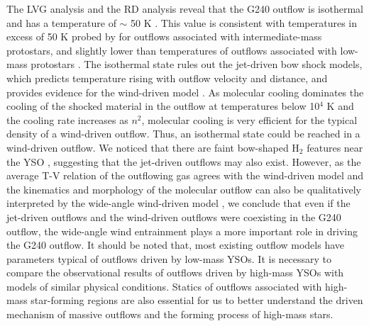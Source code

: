 The LVG analysis and the RD analysis reveal that the G240 outflow is isothermal and has a temperature of $\sim$ 50 K . This value is consistent with temperatures in excess of 50 K probed by \citet{2016A&A...587A..17V} for outflows associated with intermediate-mass protostars, and slightly lower than temperatures of outflows associated with low-mass protostars \citep{2009A&A...501..633V, 2012A&A...542A..86Y}. The isothermal state rules out the jet-driven bow shock models, which predicts temperature rising with outflow velocity and distance, and provides evidence for the wind-driven model \citep{2007prpl.conf..245A}. As molecular cooling dominates the cooling of the shocked material in the outflow at temperatures below 10$^4$ K \citep{1997IAUS..182..181H} and the cooling rate increases as $n^2$, molecular cooling is very efficient for the typical density of a wind-driven outflow. Thus, an isothermal state could be reached in a wind-driven outflow. We noticed that there are faint bow-shaped H$_{2}$ features near the YSO , suggesting that the jet-driven outflows may also exist. However, as the average T-V relation of the outflowing gas agrees with the wind-driven model and the kinematics and morphology of the molecular outflow can also be qualitatively interpreted by the wide-angle wind-driven model \citep{2009ApJ...696...66Q}, we conclude that even if the jet-driven outflows and the wind-driven outflows were coexisting in the G240 outflow, the wide-angle wind entrainment plays a more important role in driving the G240 outflow. It should be noted that, most existing outflow models have parameters typical of outflows driven by low-mass YSOs. It is necessary to compare the observational results of outflows driven by high-mass YSOs with models of similar physical conditions. Statics of outflows associated with high-mass star-forming regions are also essential for us to better understand the driven mechanism of massive outflows and the forming process of high-mass stars.

